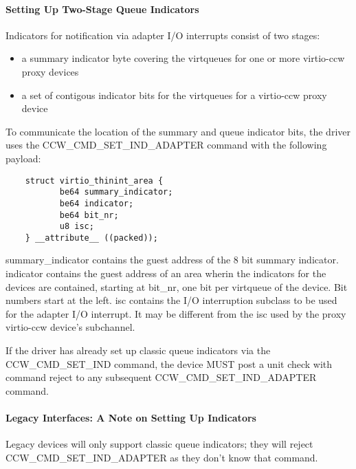 \paragraph{Setting Up Two-Stage Queue Indicators}\label{sec:Virtio Transport Options / Virtio over channel I/O / Device Initialization / Setting Up Indicators / Setting Up Two-Stage Queue Indicators}

Indicators for notification via adapter I/O interrupts consist of
two stages:
\begin{itemize}
\item a summary indicator byte covering the virtqueues for one or more
  virtio-ccw proxy devices
\item a set of contigous indicator bits for the virtqueues for a
  virtio-ccw proxy device
\end{itemize}

To communicate the location of the summary and queue indicator bits,
the driver uses the CCW_CMD_SET_IND_ADAPTER command with the following
payload:

\begin{lstlisting}
	struct virtio_thinint_area {
	       be64 summary_indicator;
	       be64 indicator;
	       be64 bit_nr;
	       u8 isc;
	} __attribute__ ((packed));
\end{lstlisting}

summary_indicator contains the guest address of the 8 bit summary
indicator.
indicator contains the guest address of an area wherin the indicators
for the devices are contained, starting at bit_nr, one bit per
virtqueue of the device. Bit numbers start at the left.
isc contains the I/O interruption subclass to be used for the adapter
I/O interrupt. It may be different from the isc used by the proxy
virtio-ccw device's subchannel.

If the driver has already set up classic queue indicators via the
CCW_CMD_SET_IND command, the device MUST post a unit check with
command reject to any subsequent CCW_CMD_SET_IND_ADAPTER command.

\paragraph{Legacy Interfaces: A Note on Setting Up Indicators}\label{sec:Virtio Transport Options / Virtio over channel I/O / Device Initialization / Setting Up Indicators / Legacy Interfaces: A Note on Setting Up Indicators}

Legacy devices will only support classic queue indicators; they will
reject CCW_CMD_SET_IND_ADAPTER as they don't know that command.

